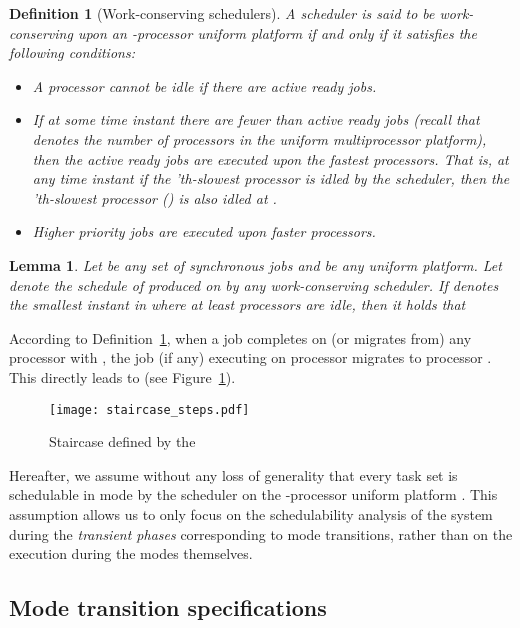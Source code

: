 \documentclass[10pt,english,a4paper]{article}
\newtheorem{lemma}{Lemma}
\newtheorem{definition}{\bf Definition}
\newenvironment{proof}[1][Proof]{\begin{trivlist}
\item[\hskip \labelsep {\bfseries #1}]}{\end{trivlist}}
\newtheorem{validity test}{Validity Test}
\newcommand{\fin}{\hfill{\small }}     \newcommand{\oh}[1]{\ensuremath{\mathcal{0}{(#1)}}} \def\thefootnote{\arabic{footnote}}
\begin{document}
\begin{definition}[Work-conserving schedulers]\label{wc_sched}
A scheduler is said to be work-conserving upon an -processor uniform platform if and only if it satisfies the following conditions:
\begin{itemize}
\item A processor cannot be idle if there are active ready jobs.
\item If at some time instant there are fewer than  active ready jobs (recall that  denotes the number of processors in the uniform multiprocessor platform), then the active ready jobs are executed upon the fastest processors. That is, at any time instant  if the 'th-slowest processor is idled by the scheduler, then the 'th-slowest processor () is also idled at . 
\item Higher priority jobs are executed upon faster processors.
\end{itemize}
\end{definition}

\begin{lemma}\label{lem:step}
Let  be any set of synchronous jobs and  be any uniform platform. Let  denote the schedule of  produced on  by any work-conserving  scheduler. If  denotes the smallest instant in  where at least  processors are idle, then it holds  that 

\end{lemma}

\begin{proof}
According to Definition~\ref{wc_sched}, when a job completes on (or migrates from) any processor  with , the job (if any) executing on processor  migrates to processor . This directly leads to  (see Figure~\ref{fig:staircase1}). \fin
\end{proof}

\begin{figure}[!h]
\centering
\texttt{[image: staircase\_steps.pdf]}
\caption{Staircase defined by the }
\label{fig:staircase1}
\end{figure}

Hereafter, we assume without any loss of generality that every task set  is schedulable in mode  by the scheduler  on the -processor uniform platform . This assumption allows us to only focus on the schedulability analysis of the system during the {\em transient phases} corresponding to mode transitions, rather than on the execution during the modes themselves. 

\subsection{Mode transition specifications}
\label{sec:modetrans_specs}
\end{document}
